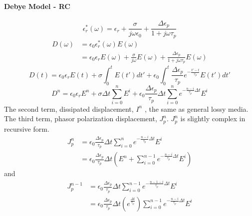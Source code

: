 \paragraph{{\msjh Debye Model - RC}}
\begin{displaymath}
  \epsilon_r^*(\omega) = \epsilon_r + \frac{\sigma}{j\omega \epsilon_0} + \frac{\Delta \epsilon_p}{1+j\omega \tau_p}
\end{displaymath}
\begin{displaymath}
  \begin{split}
    D(\omega) & = \epsilon_0 \epsilon_r^*(\omega) E(\omega)\\
    & = \epsilon_0 \epsilon_r E(\omega) + \frac{\sigma}{j\omega} E(\omega) + \frac{\Delta \epsilon_p}{1+j\omega \tau_p}E(\omega)
  \end{split}
\end{displaymath}
\begin{displaymath}
  D(t) = \epsilon_0 \epsilon_r E(t) + \sigma \int_0^t E(t')dt' + \epsilon_0 \int_0^t \frac{\Delta \epsilon_p}{\tau_p}e^{-\frac{t'-t}{\tau_p}}E(t')dt'
\end{displaymath}
\begin{equation}
  D^n = \epsilon_0 \epsilon_rE^n + \sigma \Delta t \sum_{i=0}^{n}E^i + \epsilon_0 \frac{\Delta \epsilon_p}{\tau_p}\Delta t \sum_{i=0}^{n} e^{-\frac{n-i}{\tau_p}\Delta t} E^i
\end{equation}
The second term, dissipated displacement, $I^n$ , the same as general lossy media.
The third term, phasor polarization displacement, $J_p^n$. $J_p^n$ is slightly complex in recursive form.
\begin{equation}
  \begin{split}
    J_p^n & = \epsilon_0\frac{\Delta\epsilon_p}{\tau_p}\Delta t \sum_{i=0}^ne^{-\frac{n-i}{\tau_p}\Delta t}E^i\\
    & = \epsilon_0\frac{\Delta\epsilon_p}{\tau_p}\Delta t \left( E^n + \sum_{i=0}^{n-1}e^{-\frac{n-i}{\tau_p}\Delta t}E^i\right)
  \end{split}
\end{equation}
and 
\begin{equation}
  \begin{split}
    J_p^{n-1} & = \epsilon_0\frac{\Delta\epsilon_p}{\tau_p}\Delta t \sum_{i=0}^{n-1}e^{-\frac{n-1-i}{\tau_p}\Delta t}E^i\\
    & = \epsilon_0\frac{\Delta\epsilon_p}{\tau_p}\Delta t \left( e^{\frac{\Delta t}{\tau_p}} \right) \sum_{i=0}^{n-1}e^{-\frac{n-i}{\tau_p}\Delta t}E^i
  \end{split}
\end{equation}
